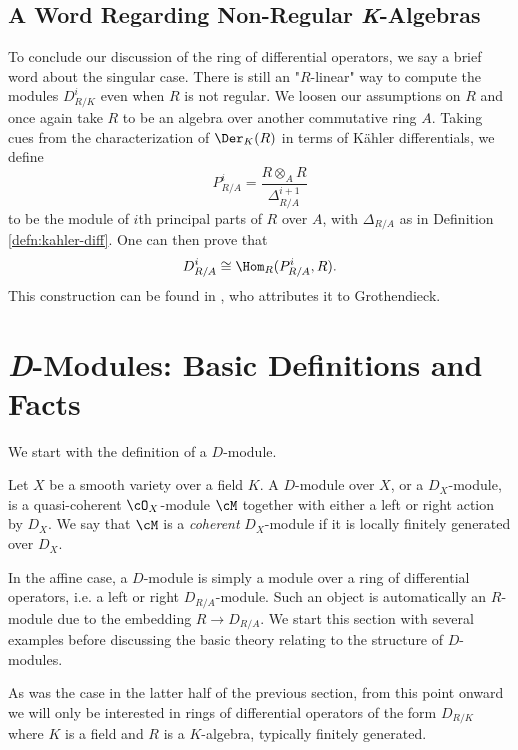 \subsection{A Word Regarding Non-Regular \textit{K}-Algebras}
To conclude our discussion of the ring of differential operators, we say a brief word about the singular case. There is still an "$R$-linear" way to compute the modules $D^i_{R/K}$  even when $R$ is not regular. We loosen our assumptions on $R$ and once again take $R$ to be an algebra over another commutative ring $A$. Taking cues from the characterization of $\Der_K(R)$ in terms of K\"ahler differentials, we define
\begin{equation}\label{eqn:principal-parts}
	P^i_{R/A} = \frac{R\otimes_A R}{\Delta^{i+1}_{R/A}}
\end{equation}
to be the module of $i$th principal parts of $R$ over $A$, with $\Delta_{R/A}$ as in Definition \ref{defn:kahler-diff}. One can then prove that
\begin{align*}
	D^i_{R/A} \cong \Hom_R(P^i_{R/A}, R).
\end{align*}
This construction can be found in \cite{jet-spaces-exposition}, who attributes it to Grothendieck.

\section{\textit{D}-Modules: Basic Definitions and Facts}
\noindent We start with the definition of a $D$-module.
\begin{defn}\label{defn:D-mod}
	Let $X$ be a smooth variety over a field $K$. A $D$-module over $X$, or a $D_X$-module, is a quasi-coherent $\cO_X$-module $\cM$ together with either a left or right action by $D_X$. We say that $\cM$ is a \emph{coherent} $D_X$-module if it is locally finitely generated over $D_X$.
\end{defn}
In the affine case, a $D$-module is simply a module over a ring of differential operators, i.e. a left or right $D_{R/A}$-module. Such an object is automatically an $R$-module due to the embedding $R\to D_{R/A}$. We start this section with several examples before discussing the basic theory relating to the structure of $D$-modules.

As was the case in the latter half of the previous section, from this point onward we will only be interested in rings of differential operators of the form $D_{R/K}$ where $K$ is a field and $R$ is a $K$-algebra, typically finitely generated.

